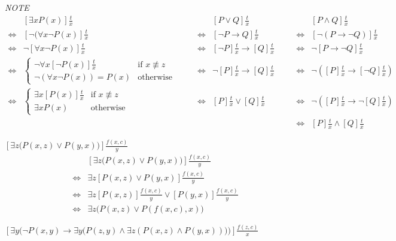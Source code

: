 \documentclass[11pt,a4paper]{article}
\begin{document}
\textit{NOTE}\\
\[\begin{array}{rllrllrl}
&[\exists xP(x)]\frac{t}{x}&\quad&&[P\vee Q]\frac{t}{x}&\quad&&[P\wedge Q]\frac{t}{x}\\
\Leftrightarrow&[\neg(\forall x\neg P(x)]\frac{t}{x}&&\Leftrightarrow&[\neg P\to Q]\frac{t}{x}&&\Leftrightarrow&[\neg(P\to\neg Q)]\frac{t}{x}\\
\Leftrightarrow&\neg[\forall x\neg P(x)]\frac{t}{x}&&\Leftrightarrow&[\neg P]\frac{t}{x}\to[Q]\frac{t}{x}&&\Leftrightarrow&\neg[P\to\neg Q]\frac{t}{x}\\
\Leftrightarrow&\begin{cases}\neg\forall x[\neg P(x)]\frac{t}{x}&\text{if }x\not\equiv z\\\neg(\forall x\neg P(x))=P(x)&\text{otherwise}\end{cases}&&\Leftrightarrow&\neg[P]\frac{t}{x}\to[Q]\frac{t}{x}&&\Leftrightarrow&\neg\left([P]\frac{t}{x}\to[\neg Q]\frac{t}{x}\right)\\
\Leftrightarrow&\begin{cases}\exists x[P(x)]\frac{t}{x}&\text{if }x\not\equiv z\\\exists xP(x)&\text{otherwise}\end{cases}&&\Leftrightarrow&[P]\frac{t}{x}\vee[Q]\frac{t}{x}&&\Leftrightarrow&\neg\left([P]\frac{t}{x}\to\neg[Q]\frac{t}{x}\right)\\
&&&&&&\Leftrightarrow&[P]\frac{t}{x}\wedge[Q]\frac{t}{x}
\end{array}\]

\qpartnb
$\left[\exists z\big(P(x,z)\vee P(y,x)\big)\right]\frac{f(x,c)}y$\\

\apartnb
\[\begin{array}{rl}
&\left[\exists z\big(P(x,z)\vee P(y,x)\big)\right]\frac{f(x,c)}y\\
\Longleftrightarrow&\exists z\left[P(x,z)\vee P(y,x)\right]\frac{f(x,c)}{y}\\
\Longleftrightarrow&\exists z[P(x,z)]\frac{f(x,c)}{y}\vee [P(y,x)]\frac{f(x,c)}{y}\\
\Longleftrightarrow&\exists z\big(P(x,z)\vee P(f(x,c),x)\big)
\end{array}\]

\qpartnb
$\left[\exists y\big(\neg P(x,y)\to\exists y\big(P(z,y)\wedge\exists z(P(x,z)\wedge P(y,x))\big)\big)\right]\frac{f(z,c)}x$\\
\end{document}
